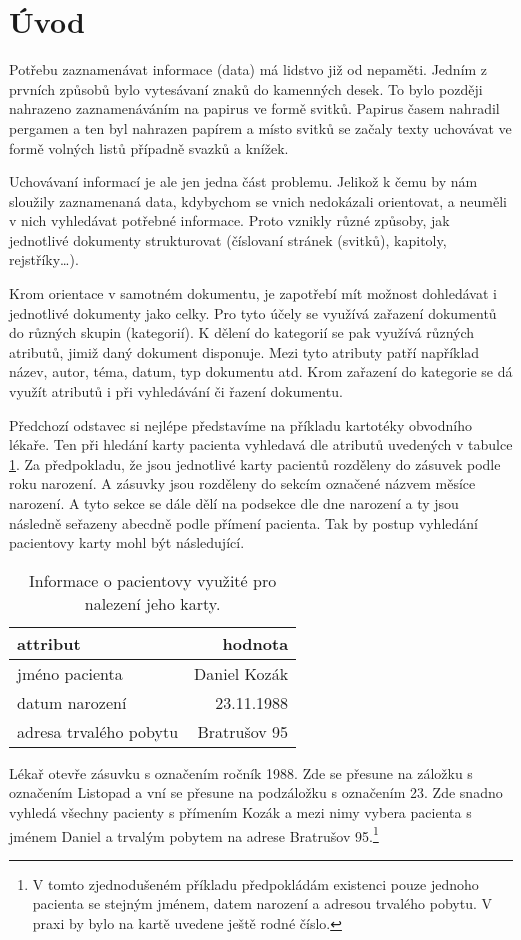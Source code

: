
\section{Úvod}
Potřebu zaznamenávat informace (data) má lidstvo již od nepaměti. Jedním z prvních způsobů bylo vytesávaní znaků do kamenných desek. To bylo později nahrazeno zaznamenáváním 
na papirus ve formě svitků. Papirus časem nahradil pergamen a ten byl nahrazen papírem a místo svitků se začaly texty uchovávat ve formě volných listů případně svazků a knížek.

Uchovávaní informací je ale jen jedna část problemu. Jelikož k čemu by nám sloužily zaznamenaná data, kdybychom se vnich nedokázali orientovat, a neuměli v nich vyhledávat potřebné informace.
Proto vznikly různé způsoby, jak jednotlivé dokumenty strukturovat (číslovaní stránek (svitků), kapitoly, rejstříky\dots). 

Krom orientace v samotném dokumentu, je zapotřebí mít možnost dohledávat i jednotlivé dokumenty jako celky.
Pro tyto účely se využívá zařazení dokumentů do různých skupin (kategorií). K dělení do kategorií se pak využívá různých atributů, jimiž daný dokument disponuje.
Mezi tyto atributy patří například název, autor, téma, datum, typ dokumentu atd. Krom zařazení do kategorie se dá využít atributů i při vyhledávání či řazení dokumentu.

Předchozí odstavec si nejlépe představíme na příkladu kartotéky obvodního lékaře. Ten při hledání karty pacienta vyhledavá dle atributů uvedených v tabulce \ref{kartoteka}. Za předpokladu, že jsou jednotlivé karty pacientů rozděleny do zásuvek podle roku narození. A zásuvky jsou rozděleny do sekcím označené názvem měsíce narození. A tyto sekce se dále dělí na podsekce dle dne narození a ty jsou následně seřazeny abecdně podle přímení pacienta. Tak by postup vyhledání pacientovy karty mohl být následující.
\begin{table}[h!]
\begin{center}
\begin{tabular}{|l|r|}
\hline
    \bfseries attribut & \bfseries hodnota\\ \hline
    jméno pacienta & Daniel Kozák \\
    datum narození & 23.11.1988 \\
    adresa trvalého pobytu & Bratrušov 95 \\
    \hline
\end{tabular}
\caption{Informace o pacientovy využité pro nalezení jeho karty.}
\label{kartoteka}
\end{center}
\end{table}
\newpage
Lékař otevře zásuvku s označením ročník 1988. Zde se přesune na záložku s označením Listopad a vní se přesune na podzáložku s označením 23. Zde snadno vyhledá všechny pacienty s přímením Kozák a mezi nimy vybera pacienta s jménem Daniel a trvalým pobytem na adrese Bratrušov 95.\footnote{V tomto zjednodušeném příkladu předpokládám existenci pouze jednoho pacienta se stejným jménem, datem narození a adresou trvalého pobytu. V praxi by bylo na kartě uvedene ještě rodné číslo.}

